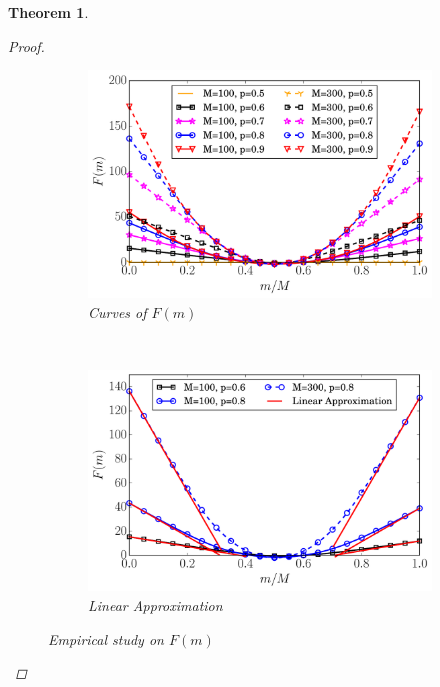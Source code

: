 \documentclass{article}
\newtheorem{theorem}{Theorem}
\begin{document}
\begin{theorem}
\begin{proof}
\begin{figure}[!htb]
    \centering
    \begin{subfigure}[t]{0.24\textwidth}
        \centering
        \includegraphics[width=\textwidth]{image/F1}
        \caption{\label{FC1} Curves of $F(m)$}
    \end{subfigure}%
    ~
    \begin{subfigure}[t]{0.24\textwidth}
        \centering
        \includegraphics[width=\textwidth]{image/F2}
        \caption{\label{FC2}  Linear Approximation}
    \end{subfigure}
    \caption{\label{FC}Empirical study on $F(m)$}
\end{figure}
\end{proof}
\end{theorem}
\end{document}
